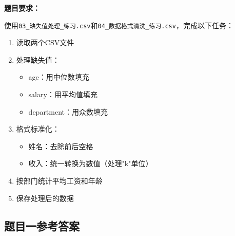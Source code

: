 \documentclass[12pt,a4paper]{article}
\begin{document}
\begin{practicebox}[竞赛模拟题2]
\textbf{题目要求：}

使用\texttt{03\_缺失值处理\_练习.csv}和\texttt{04\_数据格式清洗\_练习.csv}，完成以下任务：

\begin{enumerate}
    \item 读取两个CSV文件
    \item 处理缺失值：
    \begin{itemize}
        \item age：用中位数填充
        \item salary：用平均值填充
        \item department：用众数填充
    \end{itemize}
    \item 格式标准化：
    \begin{itemize}
        \item 姓名：去除前后空格
        \item 收入：统一转换为数值（处理"k"单位）
    \end{itemize}
    \item 按部门统计平均工资和年龄
    \item 保存处理后的数据
\end{enumerate}
\end{practicebox}

\subsection{题目一参考答案}
\end{document}
